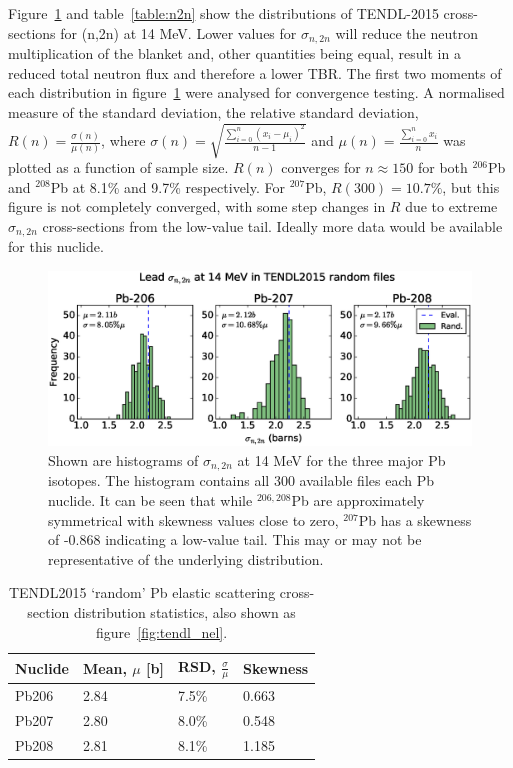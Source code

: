 Figure~\ref{fig:tendl_n2n} and table~\ref{table:n2n} show the distributions of TENDL-2015 cross-sections for (n,2n) at 14 MeV. Lower values for $\sigma_{n,2n}$ will reduce the neutron multiplication of the blanket and, other quantities being equal, result in a reduced total neutron flux and therefore a lower TBR. The first two moments of each distribution in figure~\ref{fig:tendl_n2n} were analysed for convergence testing. A normalised measure of the standard deviation, the relative standard deviation, $R(n) = \frac{\sigma(n)}{\mu(n)}$, where $\sigma(n) = \sqrt{\frac{\sum_{i=0}^{n}(x_{i}-\mu_{i})^{2}}{n-1}}$ and $\mu(n) = \frac{\sum_{i=0}^{n}x_{i}}{n}$ was plotted as a function of sample size. $R(n)$ converges for $n \approx 150$ for both $^{206}$Pb and $^{208}$Pb at 8.1\% and 9.7\% respectively. For $^{207}$Pb, $R(300)=10.7\%$, but this figure is not completely converged, with some step changes in $R$ due to extreme $\sigma_{n,2n}$ cross-sections from the low-value tail. Ideally more data would be available for this nuclide.

\begin{figure}[H]
	\includegraphics[width=\textwidth]{pb_tendl_n2n_hist}
	\caption[Histograms of $^{208}$Pb(n,2n)$^{207}$Pb data in TENDL2015.]{Shown are histograms of $\sigma_{n,2n}$ at 14 MeV for the three major Pb isotopes. The histogram contains all 300 available files each Pb nuclide. It can be seen that while $^{206,208}$Pb are approximately symmetrical with skewness values close to zero, $^{207}$Pb has a skewness of -0.868 indicating a low-value tail. This may or may not be representative of the underlying distribution.}
	\label{fig:tendl_n2n}
\end{figure}

\begin{table}[H]
  \footnotesize
  \centering 
  \begin{tabular}{llll}
    \toprule
    Nuclide & Mean, $\mu$ [b] & RSD, $\frac{\sigma}{\mu}$ & Skewness \\
    \midrule
    Pb206 & 2.84 & 7.5\% & 0.663 \\
    Pb207 & 2.80 & 8.0\% & 0.548 \\
    Pb208 & 2.81 & 8.1\% & 1.185 \\
    \bottomrule
  \end{tabular}
  \caption[Statistical moments of $^{208}$Pb(n,el)$^{208}$Pb data in TENDL2015.]{TENDL2015 `random' Pb elastic scattering cross-section distribution statistics, also shown as figure~\ref{fig:tendl_nel}.}
  \label{table:nel}
\end{table}

